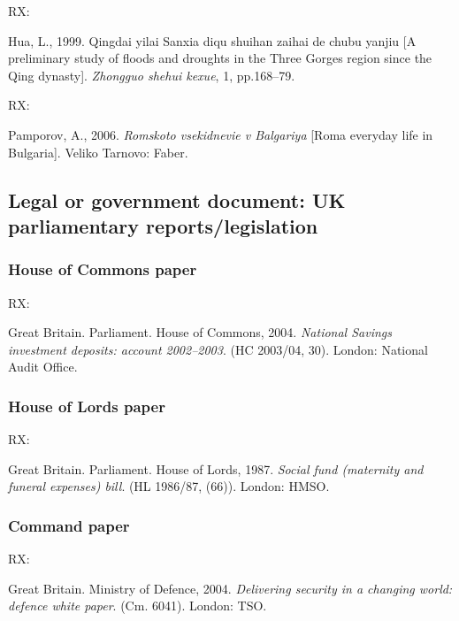 RX: \cite{hua1999qys2}

Hua, L., 1999. Qingdai yilai Sanxia diqu shuihan zaihai de chubu yanjiu [A preliminary study of floods and droughts in the Three Gorges region since the Qing dynasty]. \emph{Zhongguo shehui kexue}, 1, pp.168--79.


RX: \cite{pamporov2006rvb}

Pamporov, A., 2006. \emph{Romskoto vsekidnevie v Balgariya} [Roma everyday life in Bulgaria]. Veliko Tarnovo: Faber.



\subsection{Legal or government document: UK parliamentary reports\slash legislation}


\subsubsection*{House of Commons paper}

RX: \cite{gb.hc2003/04-30}

Great Britain. Parliament. House of Commons, 2004. \emph{National Savings investment deposits: account 2002--2003}. (HC 2003/04, 30). London: National Audit Office.



\subsubsection*{House of Lords paper}

RX: \cite{gb.hl1986/87-66}

Great Britain. Parliament. House of Lords, 1987. \emph{Social fund (maternity and funeral expenses) bill}. (HL 1986/87, (66)). London: HMSO.



\subsubsection*{Command paper}

RX: \cite{gb.cm6041}

Great Britain. Ministry of Defence, 2004. \emph{Delivering security in a changing world: defence white paper}. (Cm. 6041). London: TSO.




